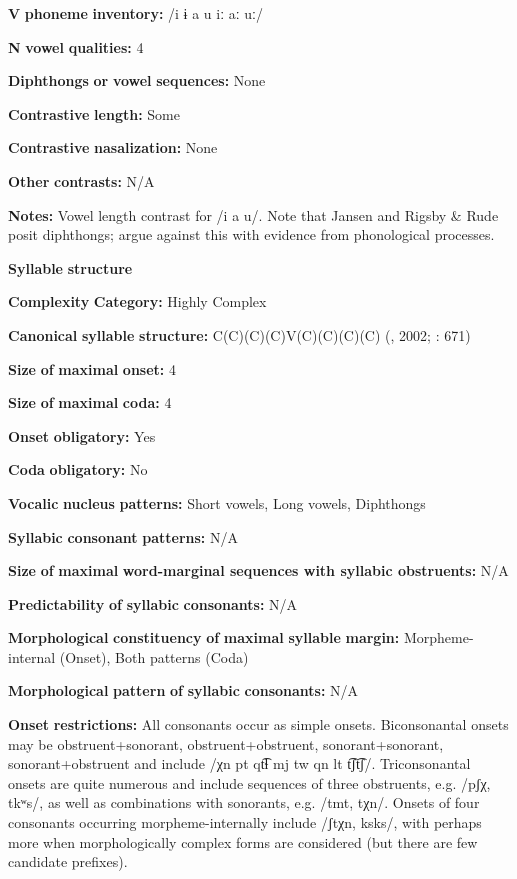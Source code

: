 \textbf{V} \textbf{phoneme} \textbf{inventory:} /i ɨ a u iː aː uː/

\textbf{N} \textbf{vowel} \textbf{qualities:} 4

\textbf{Diphthongs} \textbf{or} \textbf{vowel} \textbf{sequences:} None

\textbf{Contrastive} \textbf{length:} Some

\textbf{Contrastive} \textbf{nasalization:} None

\textbf{Other} \textbf{contrasts:} N/A

\textbf{Notes:} Vowel length contrast for /i a u/. Note that Jansen and Rigsby \& Rude posit diphthongs; \citet{HargusBeavert2006} argue against this with evidence from phonological processes.

\textbf{Syllable} \textbf{structure}

\textbf{Complexity} \textbf{Category:} Highly Complex

\textbf{Canonical} \textbf{syllable} \textbf{structure:} C(C)(C)(C)V(C)(C)(C)(C) (\citealt{HargusBeavert2006}, 2002; \citealt{RigsbyRude1996}: 671)

\textbf{Size} \textbf{of} \textbf{maximal} \textbf{onset:} 4

\textbf{Size} \textbf{of} \textbf{maximal} \textbf{coda:} 4

\textbf{Onset} \textbf{obligatory:} Yes

\textbf{Coda} \textbf{obligatory:} No

\textbf{Vocalic} \textbf{nucleus} \textbf{patterns:} Short vowels, Long vowels, Diphthongs

\textbf{Syllabic} \textbf{consonant} \textbf{patterns:} N/A

\textbf{Size} \textbf{of} \textbf{maximal} \textbf{word{}-marginal sequences with syllabic obstruents:} N/A

\textbf{Predictability} \textbf{of} \textbf{syllabic} \textbf{consonants:} N/A

\textbf{Morphological} \textbf{constituency} \textbf{of} \textbf{maximal} \textbf{syllable} \textbf{margin:} Morpheme-internal (Onset), Both patterns (Coda)

\textbf{Morphological} \textbf{pattern} \textbf{of} \textbf{syllabic} \textbf{consonants:} N/A

\textbf{Onset} \textbf{restrictions:} All consonants occur as simple onsets. Biconsonantal onsets may be obstruent+sonorant, obstruent+obstruent, sonorant+sonorant, sonorant+obstruent and include /χn pt qt͡ɬ mj tw qn lt t͡ʃt͡ʃ/. Triconsonantal onsets are quite numerous and include sequences of three obstruents, e.g. /pʃχ, tkʷs/, as well as combinations with sonorants, e.g. /tmt, tχn/. Onsets of four consonants occurring morpheme-internally include /ʃtχn, ksks/, with perhaps more when morphologically complex forms are considered (but there are few candidate prefixes).

